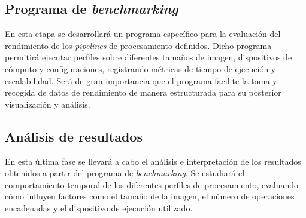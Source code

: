 \subsection{Programa de \textit{benchmarking}} \label{subsec:2_3_programa_benchmarking}

En esta etapa se desarrollará un programa específico para la evaluación del rendimiento de los
\textit{pipelines} de procesamiento definidos. Dicho programa permitirá ejecutar perfiles sobre
diferentes tamaños de imagen, dispositivos de cómputo y configuraciones, registrando métricas
de tiempo de ejecución y escalabilidad. Será de gran importancia que el programa 
facilite la toma y recogida de datos de rendimiento de manera estructurada para su 
posterior visualización y análisis.

\subsection{Análisis de resultados} \label{subsec:2_4_analisis_resultados}

En esta última fase se llevará a cabo el análisis e interpretación de los resultados obtenidos a
partir del programa de \textit{benchmarking}. Se estudiará el comportamiento temporal de
los diferentes perfiles de procesamiento, evaluando cómo influyen factores como el tamaño
de la imagen, el número de operaciones encadenadas y el dispositivo de ejecución utilizado.
